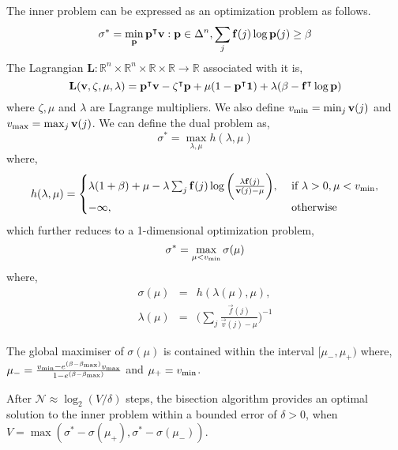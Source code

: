{The inner problem can be expressed as an optimization problem as follows.
\begin{equation}
\sigma^* = \min_{\mathbf{p}} \mathbf{\mathbf{p}}^\intercal\mathbf{v}: \mathbf{p} \in \Delta^n, \sum_{j} \mathbf{f}(j)\log{\ensuremath{\mathbf{p}}(j)} \geq \beta
\end{equation}
The Lagrangian $\mathbf{L}: \mathbb{R}^n \times \mathbb{R}^n \times \mathbb{R} \times \mathbb{R} \rightarrow \mathbb{R}$ associated with it is,
\begin{equation}
\mathbf{L}(\mathbf{v}, \zeta, \mu, \lambda) = \mathbf{\mathbf{p}}^\intercal\mathbf{v} - \mathbf{\zeta}^\intercal\mathbf{p} + \mu(1 - \mathbf{\mathbf{p}}^\intercal\mathbf{1}) + \lambda(\beta - \mathbf{f}^\intercal\log{\ensuremath{\mathbf{p}}})
\end{equation}
where $\zeta, \mu$ and $\lambda$ are Lagrange multipliers. We also define $v_{\textrm{min}} = \min_j{\mathbf{v}(j)}$ and $v_{\textrm{max}} = \max_j{\mathbf{v}(j)}$. We can define the dual problem as,
\begin{equation}
\sigma^* = \max_{\lambda, \mu} h(\lambda, \mu)
\end{equation}
where,
\begin{eqnarray}
h(\lambda, \mu) = 
	\begin{cases}
	\lambda(1 + \beta) + \mu - \lambda \sum_j \mathbf{f}(j) \log\bigg({\frac{\lambda \mathbf{f}(j)}{\mathbf{v}(j) - \mu}}\bigg), &\textrm{  if } \lambda > 0, \mu < v_{\textrm{min}}, \\
	-\infty, &\textrm{  otherwise } \\
	\end{cases} \nonumber
\end{eqnarray}
which further reduces to a 1-dimensional optimization problem,
\begin{equation}
\sigma^* = \max_{\mu < v_{\textrm{min}}} \sigma(\mu)
\end{equation}
where,
\begin{eqnarray*}
\sigma(\mu) &=& h(\lambda(\mu), \mu), \\
\lambda(\mu) &=& \bigg(\sum_{j} \frac{\vec{f}(j)}{\vec{v}(j) - \mu}\bigg)^{-1}
\end{eqnarray*}
\begin{lemma}
The global maximiser of $\sigma(\mu)$ is contained within the interval $[\mu_{-}, \mu_{+})$ where, $\mu_{-} = \frac{v_{\textrm{min}} - e^{(\beta - \beta_{\textrm{max}})}v_{\textrm{max}}}{1 - e^{(\beta - \beta_{\textrm{max}})}}$ and $\mu_{+} = v_{\textrm{min}}$.
\end{lemma}
\begin{lemma}
After $\mathcal{N} \approx \log_2(V/ \delta)$ steps, the bisection algorithm provides an optimal solution to the inner problem within a bounded error of $\delta > 0$, when
$V = \max(\sigma^* - \sigma(\mu_+), \sigma^* - \sigma(\mu_-))$.
\end{lemma}
\begin{algorithm}
\LinesNumbered
{}


\end{algorithm}}
